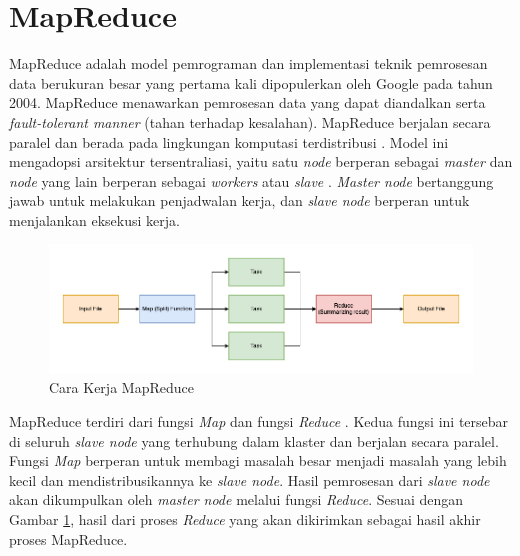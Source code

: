 \section{MapReduce}
MapReduce adalah model pemrograman dan implementasi teknik pemrosesan data berukuran besar yang pertama kali dipopulerkan oleh Google pada tahun 2004\cite{kaliaAnalysisHadoopMapReduce2021}. MapReduce menawarkan pemrosesan data yang dapat diandalkan serta \textit{fault-tolerant manner} (tahan terhadap kesalahan).  MapReduce berjalan secara paralel dan berada pada lingkungan komputasi terdistribusi \cite{cTaskFailureResilience2020}. Model ini mengadopsi arsitektur tersentraliasi, yaitu satu \textit{node} berperan sebagai \textit{master} dan \textit{node} yang lain berperan sebagai \textit{workers} atau \textit{slave} \cite{herodotouHadoopPerformanceModels2011, bakratsasHadoopMapReducePerformance2018}. \textit{Master node} bertanggung jawab untuk melakukan penjadwalan kerja, dan \textit{slave node} berperan untuk menjalankan eksekusi kerja. 

\begin{figure}[h!]
    \centering
    \includegraphics[width=1\textwidth]{figures/ch02/mapreduce-scheme.png}
    \caption{Cara Kerja MapReduce}
    \label{fig:mapreduce-flow}
\end{figure}

MapReduce terdiri dari fungsi \textit{Map} dan fungsi \textit{Reduce} \cite{gandomiHybSMRPHybridScheduling2019}. Kedua fungsi ini tersebar di seluruh \textit{slave node} yang terhubung dalam klaster dan berjalan secara paralel. Fungsi \textit{Map} berperan untuk membagi masalah besar menjadi masalah yang lebih kecil dan mendistribusikannya ke \textit{slave node}. Hasil pemrosesan dari \textit{slave node} akan dikumpulkan oleh \textit{master node} melalui fungsi \textit{Reduce}. Sesuai dengan Gambar \ref{fig:mapreduce-flow}, hasil dari proses \textit{Reduce} yang akan dikirimkan sebagai hasil akhir proses MapReduce.  

